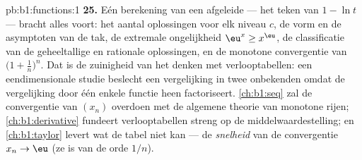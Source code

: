 \begin{solution}{pb:b1:functions:1}
\textbf{25.} Eén berekening van een afgeleide --- het teken van $1 - \ln
t$ --- bracht alles voort: het aantal oplossingen voor elk niveau $c$, de
vorm en de asymptoten van de tak, de extremale ongelijkheid $\eu^x \geq
x^\eu$, de classificatie van de geheeltallige en rationale oplossingen,
en de monotone convergentie van $\bigl(1 + \frac1n\bigr)^n$. Dat is de
zuinigheid van het denken met verlooptabellen: een eendimensionale studie
beslecht een vergelijking in twee onbekenden omdat de vergelijking door
één enkele functie heen factoriseert. \cref{ch:b1:seq} zal de
convergentie van $(x_n)$ overdoen met de algemene theorie van monotone
rijen; \cref{ch:b1:derivative} fundeert verlooptabellen streng op de
middelwaardestelling; en \cref{ch:b1:taylor} levert wat de tabel niet
kan --- de \emph{snelheid} van de convergentie $x_n \to \eu$ (ze is van
de orde $1/n$).
\end{solution}
